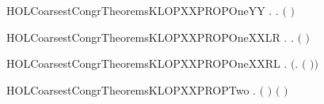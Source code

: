 \newcommand{\HOLCoarsestCongrTheoremsKLOPXXPROPOne}{\UseVerbatim{HOLCoarsestCongrTheoremsKLOPXXPROPOne}}
\begin{SaveVerbatim}{HOLCoarsestCongrTheoremsKLOPXXPROPOneYY}
\HOLTokenTurnstile{} \HOLSymConst{\HOLTokenForall{}}  .    \HOLTokenWeakTransBegin{} \HOLTokenWeakTransEnd {} \HOLSymConst{\HOLTokenEquiv{}} \HOLSymConst{\HOLTokenExists{}}.  \HOLSymConst{\HOLTokenLt{}}  \HOLSymConst{\HOLTokenConj{}} \ensuremath{(} \HOLSymConst{\ensuremath{=}}   \ensuremath{)}
\end{SaveVerbatim}
\newcommand{\HOLCoarsestCongrTheoremsKLOPXXPROPOneYY}{\UseVerbatim{HOLCoarsestCongrTheoremsKLOPXXPROPOneYY}}
\begin{SaveVerbatim}{HOLCoarsestCongrTheoremsKLOPXXPROPOneXXLR}
\HOLTokenTurnstile{} \HOLSymConst{\HOLTokenForall{}}  .    \HOLTokenTransBegin{} \HOLTokenTransEnd {} \HOLSymConst{\HOLTokenImp{}} \HOLSymConst{\HOLTokenExists{}}.  \HOLSymConst{\HOLTokenLt{}}  \HOLSymConst{\HOLTokenConj{}} \ensuremath{(} \HOLSymConst{\ensuremath{=}}   \ensuremath{)}
\end{SaveVerbatim}
\newcommand{\HOLCoarsestCongrTheoremsKLOPXXPROPOneXXLR}{\UseVerbatim{HOLCoarsestCongrTheoremsKLOPXXPROPOneXXLR}}
\begin{SaveVerbatim}{HOLCoarsestCongrTheoremsKLOPXXPROPOneXXRL}
\HOLTokenTurnstile{} \HOLSymConst{\HOLTokenForall{}}  . \ensuremath{(}\HOLSymConst{\HOLTokenExists{}}.  \HOLSymConst{\HOLTokenLt{}}  \HOLSymConst{\HOLTokenConj{}} \ensuremath{(} \HOLSymConst{\ensuremath{=}}   \ensuremath{)}\ensuremath{)} \HOLSymConst{\HOLTokenImp{}}    \HOLTokenTransBegin{} \HOLTokenTransEnd {}
\end{SaveVerbatim}
\newcommand{\HOLCoarsestCongrTheoremsKLOPXXPROPOneXXRL}{\UseVerbatim{HOLCoarsestCongrTheoremsKLOPXXPROPOneXXRL}}
\begin{SaveVerbatim}{HOLCoarsestCongrTheoremsKLOPXXPROPTwo}
\HOLTokenTurnstile{} \HOLSymConst{\HOLTokenForall{}}  .  \HOLSymConst{\HOLTokenLt{}}  \HOLSymConst{\HOLTokenImp{}} \HOLSymConst{\HOLTokenNeg{}} \ensuremath{(}  \ensuremath{)} \ensuremath{(}  \ensuremath{)}
\end{SaveVerbatim}
